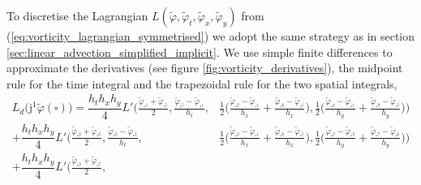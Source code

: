 \documentclass[12pt,a4paper,reqno]{article}
\begin{document}
To discretise the Lagrangian $L (\tilde{\ensuremath{\varphi}}, \tilde{\ensuremath{\varphi}}_{\ensuremath{{\ensuremath{{t}}}}}, \tilde{\ensuremath{\varphi}}_{\ensuremath{{\ensuremath{{x}}}}}, \tilde{\ensuremath{\varphi}}_{\ensuremath{{\ensuremath{{y}}}}})$ from (\ref{eq:vorticity_lagrangian_symmetrised}) we adopt the same strategy as in section \ref{sec:linear_advection_simplified_implicit}.
We use simple finite differences to approximate the derivatives (see figure \ref{fig:vorticity_derivatives}), the midpoint rule for the time integral and the trapezoidal rule for the two spatial integrals,
\begingroup
\allowdisplaybreaks
\begin{align}\label{eq:vorticity_discrete_lagrangian}
L_{d} \big( {\ensuremath{\mathrm{j}}}^{1} \tilde{\ensuremath{\varphi}} (\square) \big)
\nonumber
= \dfrac{h_{t} h_{x} h_{y}}{4} L' \Big(
  \tfrac{\tilde{\ensuremath{\varphi}}_{\square^{1}} + \tilde{\ensuremath{\varphi}}_{\square^{5}}}{2} ,
  \tfrac{\tilde{\ensuremath{\varphi}}_{\square^{5}} - \tilde{\ensuremath{\varphi}}_{\square^{1}}}{h_{t}} ,
& \tfrac{1}{2} \Big( \tfrac{\tilde{\ensuremath{\varphi}}_{\square^{2}} - \tilde{\ensuremath{\varphi}}_{\square^{1}}}{h_{x}}
                   + \tfrac{\tilde{\ensuremath{\varphi}}_{\square^{6}} - \tilde{\ensuremath{\varphi}}_{\square^{5}}}{h_{x}} \Big) , 
  \tfrac{1}{2} \Big( \tfrac{\tilde{\ensuremath{\varphi}}_{\square^{4}} - \tilde{\ensuremath{\varphi}}_{\square^{1}}}{h_{y}}
                   + \tfrac{\tilde{\ensuremath{\varphi}}_{\square^{8}} - \tilde{\ensuremath{\varphi}}_{\square^{5}}}{h_{y}} \Big)
\Big) \\
\nonumber
+ \dfrac{h_{t} h_{x} h_{y}}{4} L' \Big(
  \tfrac{\tilde{\ensuremath{\varphi}}_{\square^{2}} + \tilde{\ensuremath{\varphi}}_{\square^{6}}}{2} ,
  \tfrac{\tilde{\ensuremath{\varphi}}_{\square^{6}} - \tilde{\ensuremath{\varphi}}_{\square^{2}}}{h_{t}} ,
& \tfrac{1}{2} \Big( \tfrac{\tilde{\ensuremath{\varphi}}_{\square^{2}} - \tilde{\ensuremath{\varphi}}_{\square^{1}}}{h_{x}}
                   + \tfrac{\tilde{\ensuremath{\varphi}}_{\square^{6}} - \tilde{\ensuremath{\varphi}}_{\square^{5}}}{h_{x}} \Big) ,
  \tfrac{1}{2} \Big( \tfrac{\tilde{\ensuremath{\varphi}}_{\square^{3}} - \tilde{\ensuremath{\varphi}}_{\square^{2}}}{h_{y}}
                   + \tfrac{\tilde{\ensuremath{\varphi}}_{\square^{7}} - \tilde{\ensuremath{\varphi}}_{\square^{6}}}{h_{y}} \Big)
\Big) \\
\nonumber
+ \dfrac{h_{t} h_{x} h_{y}}{4} L' \Big(
  \tfrac{\tilde{\ensuremath{\varphi}}_{\square^{3}} + \tilde{\ensuremath{\varphi}}_{\square^{7}}}{2} ,

\end{align}
\end{document}
